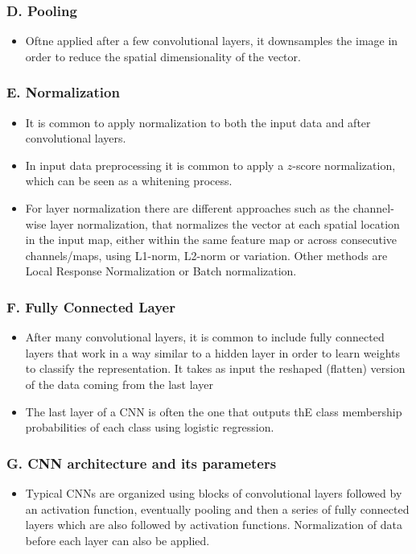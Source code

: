 \documentclass{report}
\begin{document}
\subsubsection*{D. Pooling}
\begin{itemize}
    \item Oftne applied after a few convolutional layers, it downsamples the image in order to reduce the spatial dimensionality of the vector.
\end{itemize}
\subsubsection*{E. Normalization}
\begin{itemize}
    \item It is common to apply normalization to both the input data and after convolutional layers.
    \item In input data preprocessing it is common to apply a $z$-score normalization, which can be seen as a whitening process.
    \item For layer normalization there are different approaches such as the channel-wise layer normalization, that normalizes the vector at each spatial location in the input map, either within the same feature map or across consecutive channels/maps, using L1-norm, L2-norm or variation. Other methods are Local Response Normalization or Batch normalization.
\end{itemize}
\subsubsection*{F. Fully Connected Layer}
\begin{itemize}
    \item After many convolutional layers, it is common to include fully connected layers that work in a way similar to a hidden layer in order to learn weights to classify the representation. It takes as input the reshaped (flatten) version of the data coming from the last layer
    \item The last layer of a CNN is often the one that outputs thE class membership probabilities of each class using logistic regression.
\end{itemize}
\subsubsection*{G. CNN architecture and its parameters}
\begin{itemize}
    \item Typical CNNs are organized using blocks of convolutional layers followed by an activation function, eventually pooling and then a series of fully connected layers which are also followed by activation functions. Normalization of data before each layer can also be applied.
\end{itemize}
\end{document}
